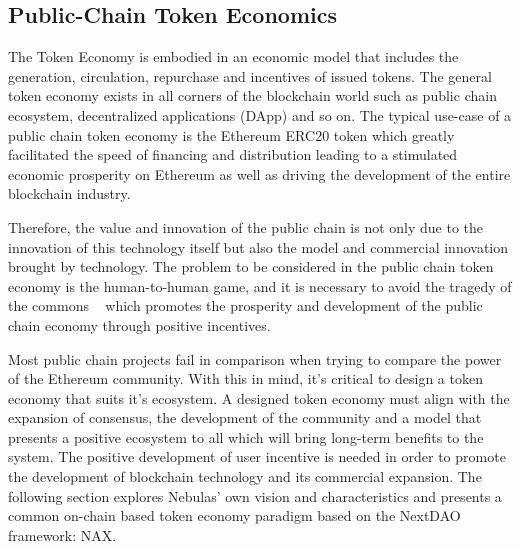 \subsection{Public-Chain Token Economics}
The Token Economy is embodied in an economic model that includes the generation, circulation, repurchase and incentives of issued tokens.  The general token economy exists in all corners of the blockchain world such as public chain ecosystem, decentralized applications (DApp) and so on. The typical use-case of a public chain token economy is the Ethereum ERC20 token which greatly facilitated the speed of financing and distribution leading to a stimulated economic prosperity on Ethereum as well as driving the development of the entire blockchain industry. 

Therefore, the value and innovation of the public chain is not only due to the innovation of this technology itself but also the model and commercial innovation brought by technology. The problem to be considered in the public chain token economy is the human-to-human game, and it is necessary to avoid the tragedy of the commons ~\cite{TragedyOfTheCommons} which promotes the prosperity and development of the public chain economy through positive incentives.

Most public chain projects fail in comparison when trying to compare the power of the Ethereum community. With this in mind, it's critical to design a token economy that suits it's ecosystem. A designed token economy must align with the expansion of consensus, the development of the community and a model that presents a positive ecosystem to all which will bring long-term benefits to the system. The positive development of user incentive is needed in order to promote the development of blockchain technology and its commercial expansion. The following section explores Nebulas' own vision and characteristics and presents a common on-chain based token economy paradigm based on the NextDAO framework: NAX.
